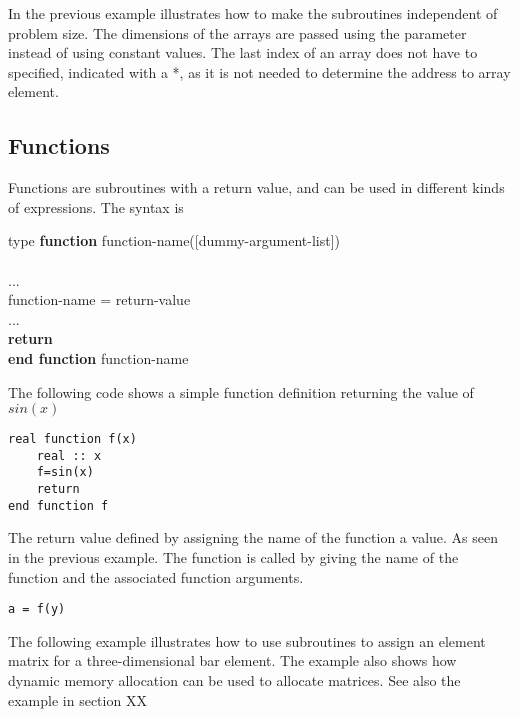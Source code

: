In the previous example illustrates how to make the subroutines independent of problem size. The dimensions of the arrays are passed using the  parameter instead of using constant values. The last index of an array does not have to specified, indicated with a *, as it is not needed to determine the address to array element.

\subsection{Functions}

Functions are subroutines with a return value, and can be used in different kinds of expressions. The syntax is

\begin{fsyntax}
type \textbf{function} function-name([dummy-argument-list])\\
\\
\ftab ...\\
\ftab function-name = return-value\\
\ftab ...\\
\ftab \textbf{return}\\
\textbf{end function} function-name
\end{fsyntax}

The following code shows a simple function definition returning the value of $sin(x)$

\begin{lstlisting}
real function f(x)
    real :: x
    f=sin(x)
    return
end function f
\end{lstlisting}

The return value defined by assigning the name of the function a value. As seen in the previous example. The function is called by giving the name of the function and the associated function arguments.

\begin{lstlisting}
a = f(y)
\end{lstlisting}

The following example illustrates how to use subroutines to assign an element matrix for a three-dimensional bar element. The example also shows how dynamic memory allocation can be used to allocate matrices. See also the example in section XX



